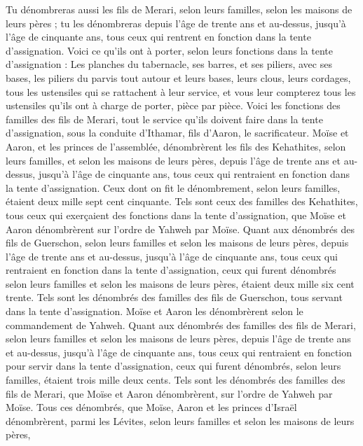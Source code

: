 \begin{multicols}{2}
Tu dénombreras aussi les fils de Merari, selon leurs familles, selon les maisons de leurs pères ;
tu les dénombreras depuis l'âge de trente ans et au-dessus, jusqu'à l'âge de cinquante ans, tous ceux qui rentrent en fonction dans la tente d'assignation.
Voici ce qu'ils ont à porter, selon leurs fonctions dans la tente d'assignation : Les planches du tabernacle, ses barres, et ses piliers, avec ses bases,
les piliers du parvis tout autour et leurs bases, leurs clous, leurs cordages, tous les ustensiles qui se rattachent à leur service, et vous leur compterez tous les ustensiles qu'ils ont à charge de porter, pièce par pièce.
Voici les fonctions des familles des fils de Merari, tout le service qu’ils doivent faire dans la tente d'assignation, sous la conduite d'Ithamar, fils d'Aaron, le sacrificateur.
Moïse et Aaron, et les princes de l'assemblée, dénombrèrent les fils des Kehathites, selon leurs familles, et selon les maisons de leurs pères,
depuis l'âge de trente ans et au-dessus, jusqu'à l'âge de cinquante ans, tous ceux qui rentraient en fonction dans la tente d'assignation.
Ceux dont on fit le dénombrement, selon leurs familles, étaient deux mille sept cent cinquante.
Tels sont ceux des familles des Kehathites, tous ceux qui exerçaient des fonctions dans la tente d'assignation, que Moïse et Aaron dénombrèrent sur l’ordre de Yahweh par Moïse.
Quant aux dénombrés des fils de Guerschon, selon leurs familles et selon les maisons de leurs pères,
depuis l'âge de trente ans et au-dessus, jusqu'à l'âge de cinquante ans, tous ceux qui rentraient en fonction dans la tente d'assignation,
ceux qui furent dénombrés selon leurs familles et selon les maisons de leurs pères, étaient deux mille six cent trente.
Tels sont les dénombrés des familles des fils de Guerschon, tous servant dans la tente d'assignation. Moïse et Aaron les dénombrèrent selon le commandement de Yahweh.
Quant aux dénombrés des familles des fils de Merari, selon leurs familles et selon les maisons de leurs pères,
depuis l'âge de trente ans et au-dessus, jusqu'à l'âge de cinquante ans, tous ceux qui rentraient en fonction pour servir dans la tente d'assignation,
ceux qui furent dénombrés, selon leurs familles, étaient trois mille deux cents.
Tels sont les dénombrés des familles des fils de Merari, que Moïse et Aaron dénombrèrent, sur l’ordre de Yahweh par Moïse.
Tous ces dénombrés, que Moïse, Aaron et les princes d'Israël dénombrèrent, parmi les Lévites, selon leurs familles et selon les maisons de leurs pères,

\end{multicols}
